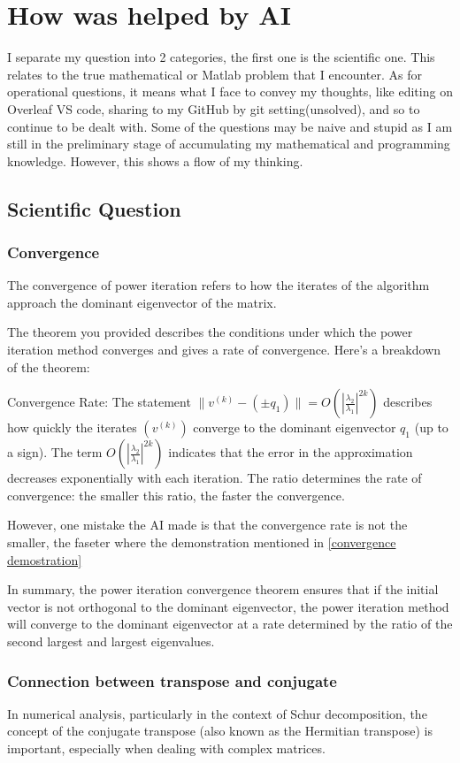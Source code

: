 \chapter{How was helped by AI}
\label{chapter4}
I separate my question into 2 categories, the first one is the scientific one. This relates to the true mathematical or Matlab problem that I encounter. As for operational questions, it means what I face to convey my thoughts, like editing on Overleaf VS code, sharing to my GitHub by git setting(unsolved), and so to continue to be dealt with. Some of the questions may be naive and stupid as I am still in the preliminary stage of accumulating my mathematical and programming knowledge. However, this shows a flow of my thinking. 

\section{Scientific Question}
\subsection{Convergence}\label{Solve conbvergence}
The convergence of power iteration refers to how the iterates of the algorithm approach the dominant eigenvector of the matrix.

The theorem you provided describes the conditions under which the power iteration method converges and gives a rate of convergence. Here’s a breakdown of the theorem:

    Convergence Rate: The statement $\|v^{(k)} - (\pm q_1)\| = O (|\frac{\lambda_2}{\lambda_1}|^{2k})$ describes how quickly the iterates $(v^{(k)})$ converge to the dominant eigenvector $q_1$ (up to a sign). The term $O (|\frac{\lambda_2}{\lambda_1}|^{2k})$ indicates that the error in the approximation decreases exponentially with each iteration. The ratio  determines the rate of convergence: the smaller this ratio, the faster the convergence.

However, one mistake the AI made is that the convergence rate is not the smaller, the faseter where the demonstration mentioned in \ref{convergence demostration}

In summary, the power iteration convergence theorem ensures that if the initial vector is not orthogonal to the dominant eigenvector, the power iteration method will converge to the dominant eigenvector at a rate determined by the ratio of the second largest and largest eigenvalues.

\subsection{Connection between transpose and conjugate}
In numerical analysis, particularly in the context of Schur decomposition, the concept of the conjugate transpose (also known as the Hermitian transpose) is important, especially when dealing with complex matrices.

